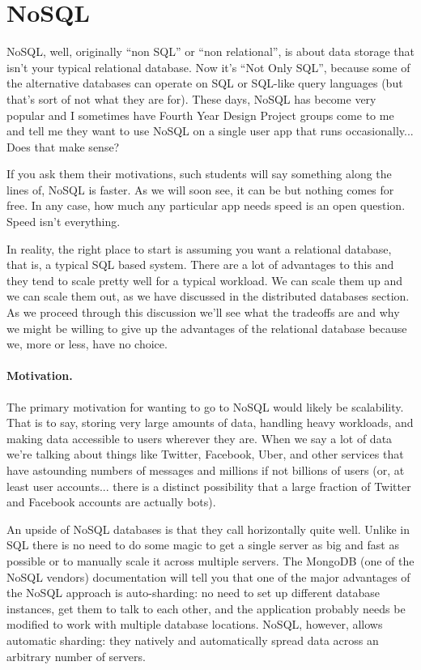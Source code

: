 




\section*{NoSQL}

NoSQL, well, originally ``non SQL'' or ``non relational'', is about data storage that isn't your typical relational database. Now it's ``Not Only SQL'', because some of the alternative databases can operate on SQL or SQL-like query languages (but that's sort of not what they are for). These days, NoSQL has become very popular and I sometimes have Fourth Year Design Project groups come to me and tell me they want to use NoSQL on a single user app that runs occasionally... Does that make sense?

If you ask them their motivations, such students will say something along the lines of, NoSQL is faster. As we will soon see, it can be but nothing comes for free. In any case, how much any particular app needs speed is an open question. Speed isn't everything. 

In reality, the right place to start is assuming you want a relational database, that is, a typical SQL based system. There are a lot of advantages to this and they tend to scale pretty well for a typical workload. We can scale them up and we can scale them out, as we have discussed in the distributed databases section. As we proceed through this discussion we'll see what the tradeoffs are and why we might be willing to give up the advantages of the relational database because we, more or less, have no choice.

\paragraph{Motivation.} The primary motivation for wanting to go to NoSQL would likely be scalability. That is to say, storing very large amounts of data, handling heavy workloads, and making data accessible to users wherever they are. When we say a lot of data we're talking about things like Twitter, Facebook, Uber, and other services that have astounding numbers of messages and millions if not billions of users (or, at least user accounts... there is a distinct possibility that a large fraction of Twitter and Facebook accounts are actually bots). 

An upside of NoSQL databases is that they call horizontally quite well. Unlike in SQL there is no need to do some magic to get a single server as big and fast as possible or to manually scale it across multiple servers. The MongoDB (one of the NoSQL vendors) documentation will tell you that one of the major advantages of the NoSQL approach is auto-sharding: no need to set up different database instances, get them to talk to each other, and the application probably needs be modified to work with multiple database locations. NoSQL, however, allows automatic sharding: they natively and automatically spread data across an arbitrary number of servers.  


